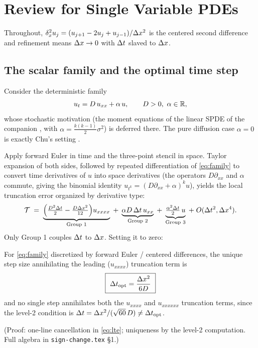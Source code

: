 \section{Review for Single Variable PDEs}
\label{sec:method}

Throughout, $\delta_x^2 u_j = (u_{j+1}-2u_j+u_{j-1})/\Delta x^2$ is the centered second difference and refinement means $\Delta x\to0$ with $\Delta t$ slaved to $\Delta x$.

\subsection{The scalar family and the optimal time step}

Consider the deterministic family
\begin{equation}\label{eq:family} u_t = D\,u_{xx} + \alpha\,u, \qquad D>0,\ \alpha\in\mathbb{R},
\end{equation} whose stochastic motivation (the moment equations of the linear SPDE of the companion \secStochX, with $\alpha = \frac{k(k-1)}2\sigma^2$) is deferred there. The pure diffusion case $\alpha=0$ is exactly Chu's setting \citep{chu2011}.

Apply forward Euler in time and the three-point stencil in space. Taylor expansion of both sides, followed by repeated differentiation of
\eqref{eq:family} to convert time derivatives of $u$ into space derivatives (the operators $D\partial_{xx}$ and $\alpha$ commute, giving the binomial identity $u_{t^k} = (D\partial_{xx}+\alpha)^k u$), yields the local truncation error organized by derivative type:
\begin{equation}\label{eq:lte}
\mathcal{T} \;=\;
\underbrace{\Bigl(\tfrac{D^2\Delta t}2 - \tfrac{D\Delta x^2}{12}\Bigr)u_{xxxx}}_{\text{Group 1}}
\;+\;
\underbrace{\alpha D\,\Delta t\,u_{xx}}_{\text{Group 2}}
\;+\;
\underbrace{\tfrac{\alpha^2\Delta t}2\,u}_{\text{Group 3}}
\;+\;O(\Delta t^2,\Delta x^4).
\end{equation} Only Group 1 couples $\Delta t$ to $\Delta x$. Setting it to zero:

\begin{theorem}\label{thm:ots}
For \eqref{eq:family} discretized by forward Euler / centered differences, the
unique step size annihilating the leading ($u_{xxxx}$) truncation term is
\begin{equation}\label{eq:dtopt2}
\boxed{\ \Delta t_{\mathrm{opt}} = \frac{\Delta x^2}{6D}\ }
\end{equation}
and no single step annihilates both the $u_{xxxx}$ and $u_{xxxxxx}$ truncation
terms, since the level-2 condition is $\Delta t = \Delta x^2/(\sqrt{60}\,D) \ne \Delta t_{\mathrm{opt}}$.
\end{theorem}
\noindent (Proof: one-line cancellation in \eqref{eq:lte}; uniqueness by the
level-2 computation. Full algebra in \texttt{sign-change.tex} \S1.)

